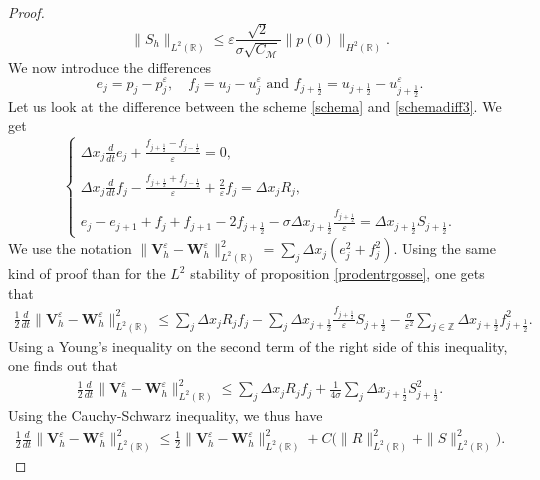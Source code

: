 \documentclass[a4paper,french,english,10pt]{article}
\newcommand\eps{\varepsilon}
\newcommand\V{\mathbf{V}}
\newcommand\W{\mathbf{W}}
\begin{document}
\begin{proof}
\begin{equation}\label{eq:xx}
\| S_h \|_{L^2(\mathbb{R})} \leq \eps  \frac{\sqrt{2}}{\sigma \sqrt{C_{\mathcal{M}}}}
\| p(0)\|_{H^2(\mathbb{R})}.
\end{equation}
We now introduce the differences
\begin{equation*}
e_j= p_j-p_{j}^{\eps} ,\quad
f_j = u_j-u_j^{\eps} \mbox{ and }
f_{j+\frac12 }= u_{j+\frac12 }-u_{j+\frac12 }^{\eps}.
\end{equation*}
Let us  look at the difference between the scheme \eqref{schema} and
\eqref{schemadiff3}. We get
\begin{equation*}\label{diff222}
\left\{
\begin{array}{lll}
\Delta x_j\frac{d}{dt} e_j
+\frac{f_{j+\frac12 }-f_{j-\frac12 }}{\eps}=0,\\
\\
\Delta x_j\frac{d}{dt} f_j
-\frac{f_{j+\frac12 }+f_{j-\frac12 }}{\eps}+\frac{2}{\eps}f_j=
\Delta x_j
R_j,\\
\\
e_j-e_{j+1}+f_j+f_{j+1} -2f_{j+\frac12 } -\sigma \Delta x_{j+\frac12 }
\frac{f_{j+\frac12 } }{\eps}=\Delta x_{j+\frac12}S_{j+\frac12 } .
\end{array}
\right.
\end{equation*}
We use the notation
$\|\V_h^{\eps}-\W^\eps_h\|_{L^2(\mathbb R)}^2=\sum_j \Delta x_j
(e_j^2+f_j^2)$.
Using the same kind of proof than for the $L^2$ stability of 
proposition \ref{prodentrgosse}, one gets that
\begin{eqnarray*}
\frac12 \frac{d}{dt}\|\V_h^{\eps}-\W^\eps_h\|_{L^2(\mathbb R)}
^2 \leq \sum_j \Delta x_j R_jf_j -\sum_j\Delta x_{j+\frac12}
\frac{f_{j+\frac12 }}{\eps}S_{j+\frac12 }
-\frac{\sigma}{\eps^2}\sum_{j\in \mathbb{Z}} \Delta
x_{j+\frac12}f_{j+\frac12 }^2.
\end{eqnarray*}
Using a Young's inequality on the second 
term of the right side of this inequality,
one finds out that 
\begin{eqnarray*}
\frac12 \frac{d}{dt}\|\V_h^{\eps}-\W^\eps_h\|_{L^2(\mathbb R)}
^2 \leq \sum_j \Delta x_j R_jf_j  +
\frac1{4\sigma  }
\sum_j \Delta x_{j+\frac12} 
{S_{j+\frac12 }^2}
.
\end{eqnarray*}
Using the Cauchy-Schwarz inequality, we thus have
\begin{eqnarray*}
\frac12 \frac{d}{dt}\|\V_h^{\eps}-\W^\eps_h\|_{L^2(\mathbb R)}
^2 \leq \frac12 \|\V_h^{\eps}-\W^\eps_h\|_{L^2(\mathbb R)}^2 +
C\bigg( \| R\|_{L^2(\mathbb R)}^2 +\| S \|_{L^2(\mathbb R)}^2\bigg).

\end{eqnarray*}
\end{proof}
\end{document}
